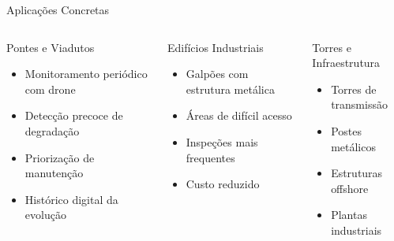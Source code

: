 \documentclass[aspectratio=169, 12pt]{beamer}
\begin{document}
\begin{frame}{Aplicações Concretas}
    \begin{columns}[T]
        \begin{block}{\faBridgeWater\hspace{0.2cm} Pontes e Viadutos}
            \begin{itemize}
                \item Monitoramento periódico com drone
                \item Detecção precoce de degradação
                \item Priorização de manutenção
                \item Histórico digital da evolução
            \end{itemize}
        \end{block}

        \vspace{0.2cm}

        \begin{block}{\faBuilding\hspace{0.2cm} Edifícios Industriais}
            \begin{itemize}
                \item Galpões com estrutura metálica
                \item Áreas de difícil acesso
                \item Inspeções mais frequentes
                \item Custo reduzido
            \end{itemize}
        \end{block}

        \begin{block}{\faBroadcastTower\hspace{0.2cm} Torres e Infraestrutura}
            \begin{itemize}
                \item Torres de transmissão
                \item Postes metálicos
                \item Estruturas offshore
                \item Plantas industriais
            \end{itemize}
        \end{block}

        \vspace{0.2cm}


\end{columns}
\end{frame}
\end{document}
